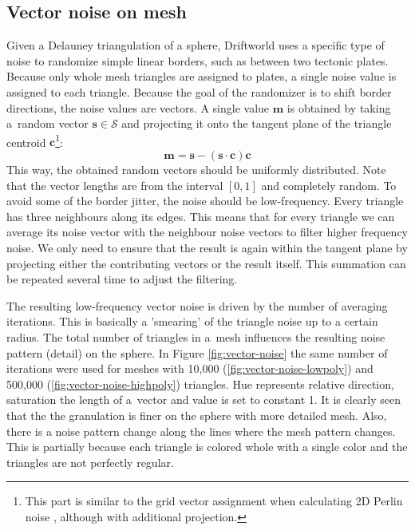 \subsection{Vector noise on mesh}
\label{subsec:vector-noise-on-mesh}
Given a Delauney triangulation of a sphere, Driftworld uses a specific type of noise to randomize simple linear borders, such as between two tectonic plates. Because only whole mesh triangles are assigned to plates, a single noise value is assigned to each triangle. Because the goal of the randomizer is to shift border directions, the noise values are vectors. A single value $\mathbf{m}$ is obtained by taking a~random vector $\mathbf{s}\in\mathcal{S}$ and projecting it onto the tangent plane of the triangle centroid $\mathbf{c}$\footnote{This part is similar to the grid vector assignment when calculating 2D Perlin noise \cite{perlinnoise}, although with additional projection.}:
$$\mathbf{m} = \mathbf{s}-(\mathbf{s}\cdot\mathbf{c})\mathbf{c}$$
This way, the obtained random vectors should be uniformly distributed. Note that the vector lengths are from the interval $[0,1]$ and completely random. To avoid some of the border jitter, the noise should be low-frequency. Every triangle has three neighbours along its edges. This means that for every triangle we can average its noise vector with the neighbour noise vectors to filter higher frequency noise. We only need to ensure that the result is again within the tangent plane by projecting either the contributing vectors or the result itself. This summation can be repeated several time to adjust the filtering. 

The resulting low-frequency vector noise is driven by the number of averaging iterations. This is basically a 'smearing' of the triangle noise up to a certain radius. The total number of triangles in a~mesh influences the resulting noise pattern (detail) on the sphere. In Figure \ref{fig:vector-noise} the same number of iterations were used for meshes with 10,000 (\ref{fig:vector-noise-lowpoly}) and 500,000 (\ref{fig:vector-noise-highpoly}) triangles. Hue represents relative direction, saturation the length of a~vector and value is set to constant 1. It is clearly seen that the the granulation is finer on the sphere with more detailed mesh. Also, there is a noise pattern change along the lines where the mesh pattern changes. This is partially because each triangle is colored whole with a single color and the triangles are not perfectly regular.

